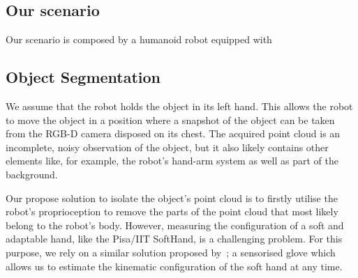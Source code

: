 \subsection{Our scenario}
\label{sec:scenario}
Our scenario is composed by a humanoid robot equipped with

\subsection{Object Segmentation}
\label{sec:segmentation}

We assume that the robot holds the object in its left hand. This allows the robot to move the object in a position where a snapshot of the object can be taken from the RGB-D camera disposed on its chest. 
The acquired point cloud is an incomplete, noisy observation of the object, but it also likely contains other elements like, for example, the robot's hand-arm system as well as part of the background. 

Our propose solution to isolate the object's point cloud is to firstly utilise the robot's proprioception to remove the parts of the point cloud that most likely belong to the robot's body. However, measuring  the  configuration of  a  soft and  adaptable hand, like the Pisa/IIT SoftHand, is a challenging problem. For this purpose, we rely on a similar solution proposed by~\citet{Santaera2015Lowcost}; a sensorised glove which allows us to estimate the kinematic configuration of the soft hand at any time.


